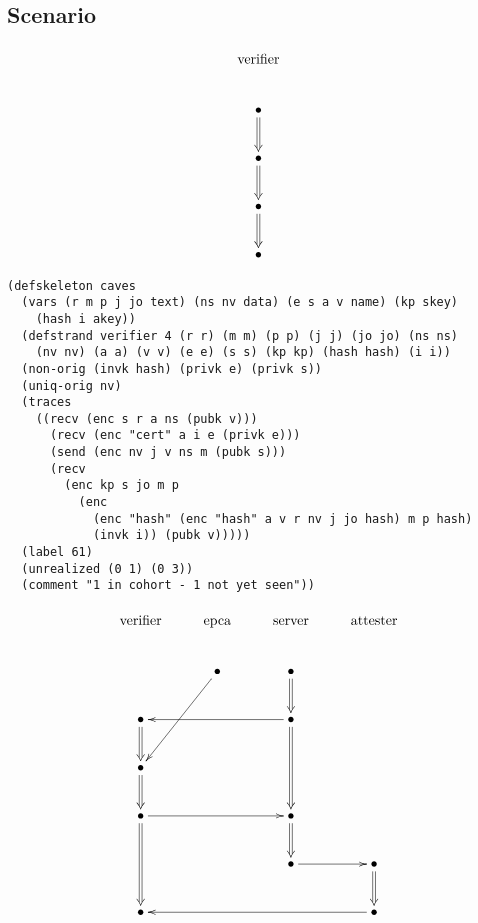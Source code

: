 \documentclass[titlepage,12pt]{article}
\theoremstyle{definition}
\begin{document}
\subsection{Scenario}

$$\xymatrix{
\txt{\strut verifier}\\
\bullet\ar@{=>}[d]\\
\bullet\ar@{=>}[d]\\
\bullet\ar@{=>}[d]\\
\bullet}$$

\begin{verbatim}
(defskeleton caves
  (vars (r m p j jo text) (ns nv data) (e s a v name) (kp skey)
    (hash i akey))
  (defstrand verifier 4 (r r) (m m) (p p) (j j) (jo jo) (ns ns)
    (nv nv) (a a) (v v) (e e) (s s) (kp kp) (hash hash) (i i))
  (non-orig (invk hash) (privk e) (privk s))
  (uniq-orig nv)
  (traces
    ((recv (enc s r a ns (pubk v)))
      (recv (enc "cert" a i e (privk e)))
      (send (enc nv j v ns m (pubk s)))
      (recv
        (enc kp s jo m p
          (enc
            (enc "hash" (enc "hash" a v r nv j jo hash) m p hash)
            (invk i)) (pubk v)))))
  (label 61)
  (unrealized (0 1) (0 3))
  (comment "1 in cohort - 1 not yet seen"))
\end{verbatim}

$$\xymatrix{
\txt{\strut verifier}&\txt{\strut epca}&\txt{\strut server}&\txt{\strut attester}\\
&\bullet\ar[ldd]&\bullet\ar@{=>}[d]&\\
\bullet\ar@{=>}[d]&&\bullet\ar@{=>}[dd]\ar[ll]&\\
\bullet\ar@{=>}[d]&&&\\
\bullet\ar@{=>}[dd]\ar[rr]&&\bullet\ar@{=>}[d]&\\
&&\bullet\ar[r]&\bullet\ar@{=>}[d]\\
\bullet&&&\bullet\ar[lll]}$$
\end{document}
